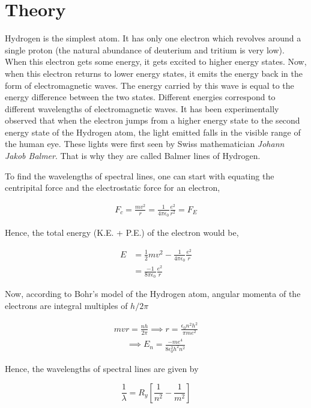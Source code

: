 \section{Theory}

Hydrogen is the simplest atom. It has only one electron which revolves around a single proton (the natural abundance of deuterium and tritium is very low). When this electron gets some energy, it gets excited to higher energy states. Now, when this electron returns to lower energy states, it emits the energy back in the form of electromagnetic waves. The energy carried by this wave is equal to the energy difference between the two states. Different energies correspond to different wavelengths of electromagnetic waves. It has been experimentally observed that when the electron jumps from a higher energy state to the second energy state of the Hydrogen atom, the light emitted falls in the visible range of the human eye. These lights were first seen by Swiss mathematician \textit{Johann Jakob Balmer}. That is why they are called Balmer lines of Hydrogen.

To find the wavelengths of spectral lines, one can start with equating the centripital force and the electrostatic force for an electron,

\begin{align}
    F_c = \frac{mv^2}{r} = \frac{1}{4\pi\epsilon_0}\frac{e^2}{r^2} = F_E
\end{align}

Hence, the total energy (K.E. + P.E.) of the electron would be,

\begin{align}
    E &= \frac{1}{2}mv^2 - \frac{1}{4\pi\epsilon_0}\frac{e^2}{r}\\
    &= \frac{-1}{8\pi\epsilon_0}\frac{e^2}{r}
\end{align}


Now, according to Bohr's model of the Hydrogen atom, angular momenta of the electrons are integral multiples of $h/2\pi$ 

\begin{align}
    mvr=\frac{nh}{2\pi} \implies r = \frac{\epsilon_0n^2h^2}{\pi m e^2}
\end{align}
\begin{align}
    \implies E_n = \frac{-me^4}{8\epsilon_0^2h^2n^2}
\end{align}

Hence, the wavelengths of spectral lines are given by

\begin{equation}
    \frac{1}{\lambda} = R_y\left[\frac{1}{n^2}-\frac{1}{m^2} \right]
    \label{eqn:1}
\end{equation}

